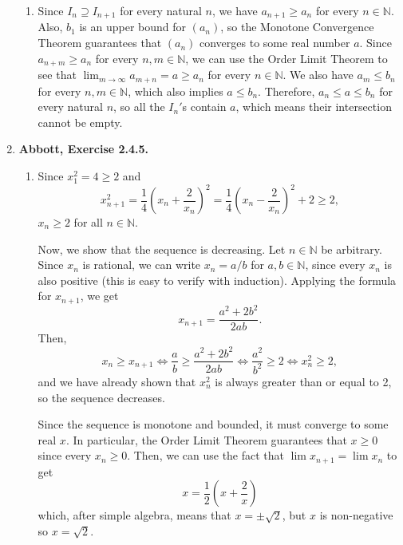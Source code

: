 \documentclass{article}
\newcommand{\N}{\mathbb{N}}
\newcommand{\exc}[2][Abbott]{\item \textbf{#1, Exercise #2.}}
\begin{document}
\begin{enumerate}
\begin{enumerate}
        \item Since $I_{n} \supseteq I_{n+1}$ for every natural $n$, we have $a_{n+1} \geq a_n$ for every $n \in \N$. Also, $b_1$ is an upper bound for $(a_n)$, so the Monotone Convergence Theorem guarantees that $(a_n)$ converges to some real number $a$. Since $a_{n+m} \geq a_n$ for every $n,m \in \N$, we can use the Order Limit Theorem to see that $\lim_{m \to \infty} a_{m+n} = a \geq a_n$ for every $n \in \N$. We also have $a_m \leq b_n$ for every $n, m \in \N$, which also implies $a \leq b_n$. Therefore, $a_n \leq a \leq b_n$ for every natural $n$, so all the $I_n'$s contain $a$, which means their intersection cannot be empty.
    \end{enumerate}
    
    \exc{2.4.5}
    \begin{enumerate}
        \item Since $x_1^2 = 4 \geq 2$ and
        \begin{equation*}
            x_{n+1}^2 = \frac{1}{4}\left(x_n+\frac{2}{x_n}\right)^2 = 
            \frac{1}{4}\left(x_n-\frac{2}{x_n}\right)^2 + 2 \geq 2,
        \end{equation*} $x_n \geq 2$ for all $n \in \N$.
        
        Now, we show that the sequence is decreasing. Let $n \in \N$ be arbitrary. Since $x_n$ is rational, we can write $x_n = a/b$ for $a,b \in \N$, since every $x_n$ is also positive (this is easy to verify with induction). Applying the formula for $x_{n+1}$, we get 
        \begin{equation*}
            x_{n+1} = \frac{a^2+2b^2}{2ab}.
        \end{equation*}
        Then, 
        \begin{equation*}
            x_n \geq x_{n+1} \iff \frac{a}{b} \geq \frac{a^2+2b^2}{2ab} \iff
            \frac{a^2}{b^2} \geq 2 \iff x_n^2 \geq 2,
        \end{equation*} and we have already shown that $x_n^2$ is always greater than or equal to 2, so the sequence decreases.
        
        Since the sequence is monotone and bounded, it must converge to some real $x$. In particular, the Order Limit Theorem guarantees that $x \geq 0$ since every $x_n \geq 0$.
        Then, we can use the fact that $\lim x_{n+1} = \lim x_n$ to get 
        \begin{equation*}
            x = \frac{1}{2} \left(x + \frac{2}{x}\right)
        \end{equation*} which, after simple algebra, means that $x = \pm \sqrt{2}$, but $x$ is non-negative so $x = \sqrt{2}$.
        

\end{enumerate}
\end{enumerate}
\end{document}
